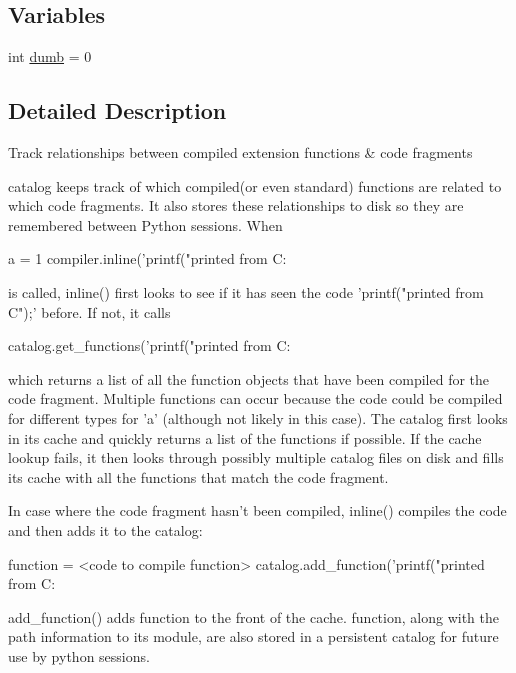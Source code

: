 \subsection*{Variables}
\begin{DoxyCompactItemize}
\item 
int \hyperlink{namespacescipy_1_1weave_1_1catalog_aa001d0ba8c28047649282ca5ff3583a6}{dumb} = 0
\end{DoxyCompactItemize}


\subsection{Detailed Description}
\begin{DoxyVerb}Track relationships between compiled extension functions & code fragments

    catalog keeps track of which compiled(or even standard) functions are
    related to which code fragments.  It also stores these relationships
    to disk so they are remembered between Python sessions.  When

a = 1
compiler.inline('printf("printed from C: %

    is called, inline() first looks to see if it has seen the code
    'printf("printed from C");' before.  If not, it calls

catalog.get_functions('printf("printed from C: %

    which returns a list of all the function objects that have been compiled
    for the code fragment.  Multiple functions can occur because the code
    could be compiled for different types for 'a' (although not likely in
    this case). The catalog first looks in its cache and quickly returns
    a list of the functions if possible.  If the cache lookup fails, it then
    looks through possibly multiple catalog files on disk and fills its
    cache with all the functions that match the code fragment.

    In case where the code fragment hasn't been compiled, inline() compiles
    the code and then adds it to the catalog:

function = <code to compile function>
catalog.add_function('printf("printed from C: %

    add_function() adds function to the front of the cache.  function,
    along with the path information to its module, are also stored in a
    persistent catalog for future use by python sessions.
\end{DoxyVerb}
 

